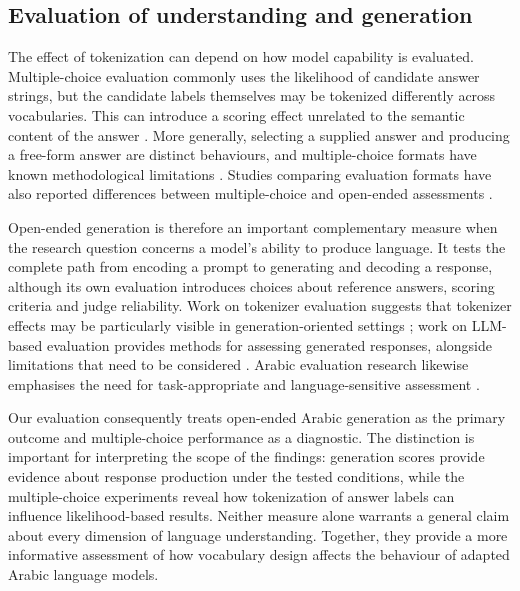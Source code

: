 \documentclass[a4paper,fleqn]{cas-sc}
\begin{document}
\subsection{Evaluation of understanding and generation}
\label{sec:related:eval}

The effect of tokenization can depend on how model capability is evaluated. Multiple-choice evaluation commonly uses the likelihood of candidate answer strings, but the candidate labels themselves may be tokenized differently across vocabularies. This can introduce a scoring effect unrelated to the semantic content of the answer \citep{zheng2024large,sanzguerrero2025mind}. More generally, selecting a supplied answer and producing a free-form answer are distinct behaviours, and multiple-choice formats have known methodological limitations \citep{balepur2025which,lyu2024beyond}. Studies comparing evaluation formats have also reported differences between multiple-choice and open-ended assessments \citep{wei2024rethinking,myrzakhan2024open,chandak2025answer}.

Open-ended generation is therefore an important complementary measure when the research question concerns a model's ability to produce language. It tests the complete path from encoding a prompt to generating and decoding a response, although its own evaluation introduces choices about reference answers, scoring criteria and judge reliability. Work on tokenizer evaluation suggests that tokenizer effects may be particularly visible in generation-oriented settings \citep{goldman2024unpacking}; work on LLM-based evaluation provides methods for assessing generated responses, alongside limitations that need to be considered \citep{zheng2023judging}. Arabic evaluation research likewise emphasises the need for task-appropriate and language-sensitive assessment \citep{elfilali2024rethinking}.

Our evaluation consequently treats open-ended Arabic generation as the primary outcome and multiple-choice performance as a diagnostic. The distinction is important for interpreting the scope of the findings: generation scores provide evidence about response production under the tested conditions, while the multiple-choice experiments reveal how tokenization of answer labels can influence likelihood-based results. Neither measure alone warrants a general claim about every dimension of language understanding. Together, they provide a more informative assessment of how vocabulary design affects the behaviour of adapted Arabic language models.
\end{document}
